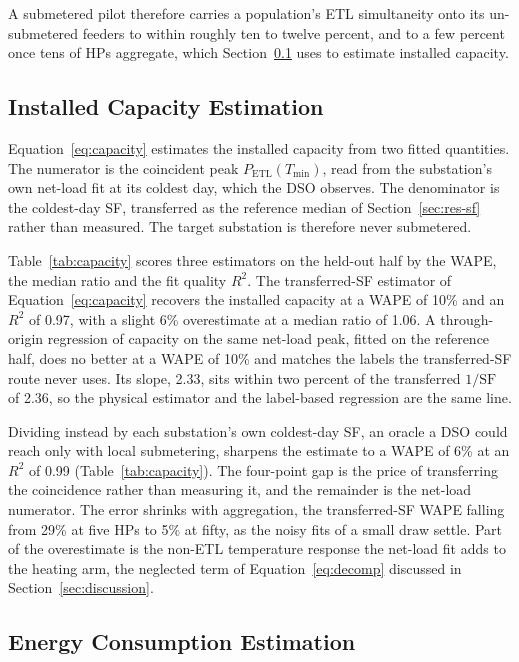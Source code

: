 \documentclass[9pt,journal,a4]{IEEEtran}
\begin{document}
A submetered pilot therefore carries a population's ETL simultaneity onto its un-submetered feeders to within roughly ten to twelve percent, and to a few percent once tens of HPs aggregate, which Section~\ref{sec:res-capacity} uses to estimate installed capacity.




\subsection{Installed Capacity Estimation}
\label{sec:res-capacity}

Equation~\eqref{eq:capacity} estimates the installed capacity from two fitted quantities. The numerator is the coincident peak $P_{\mathrm{ETL}}(T_{\min})$, read from the substation's own net-load fit at its coldest day, which the DSO observes. The denominator is the coldest-day SF, transferred as the reference median of Section~\ref{sec:res-sf} rather than measured. The target substation is therefore never submetered.

Table~\ref{tab:capacity} scores three estimators on the held-out half by the WAPE, the median ratio and the fit quality $R^2$. The transferred-SF estimator of Equation~\eqref{eq:capacity} recovers the installed capacity at a WAPE of 10\% and an $R^2$ of 0.97, with a slight 6\% overestimate at a median ratio of 1.06. A through-origin regression of capacity on the same net-load peak, fitted on the reference half, does no better at a WAPE of 10\% and matches the labels the transferred-SF route never uses. Its slope, 2.33, sits within two percent of the transferred $1/\mathrm{SF}$ of 2.36, so the physical estimator and the label-based regression are the same line.

Dividing instead by each substation's own coldest-day SF, an oracle a DSO could reach only with local submetering, sharpens the estimate to a WAPE of 6\% at an $R^2$ of 0.99 (Table~\ref{tab:capacity}). The four-point gap is the price of transferring the coincidence rather than measuring it, and the remainder is the net-load numerator. The error shrinks with aggregation, the transferred-SF WAPE falling from 29\% at five HPs to 5\% at fifty, as the noisy fits of a small draw settle. Part of the overestimate is the non-ETL temperature response the net-load fit adds to the heating arm, the neglected term of Equation~\eqref{eq:decomp} discussed in Section~\ref{sec:discussion}.




\subsection{Energy Consumption Estimation}
\label{sec:res-energy}
\end{document}
